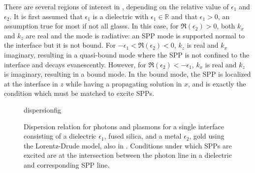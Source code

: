 There are several regions of interest in ,
depending on the relative value of $\epsilon_1$ and $\epsilon_2$.  It is
first assumed that $\epsilon_1$ is a dielectric with
$\epsilon_1\in\mathbb{R}$ and that $\epsilon_1 > 0$, an assumption true for
most if not all glasss.  In this case, for $\Re(\epsilon_2)>0$, both $k_x$
and $k_z$ are real and the mode is radiative: an SPP mode is supported
normal to the interface but it is not bound.  For
$-\epsilon_1<\Re(\epsilon_2)<0$, $k_z$ is real and $k_x$ imaginary,
resulting in a quasi-bound mode where the SPP is not confined to the
interface and decays evanescently.  However, for
$\Re(\epsilon_2)<-\epsilon_1$, $k_x$ is real and $k_z$ is imaginary,
resulting in a bound mode.  In the bound mode, the SPP is localized at the
interface in $z$ while having a propagating solution in $x$, and is exactly
the condition which must be matched to excite SPPs.
\begin{figure}[ht]
 \centering
{dispersionfig}
\caption{ Dispersion relation for photons and plasmons for a single
interface consisting of a dielectric $\epsilon_1$, fused silica, and a
metal $\epsilon_2$, gold using the Lorentz-Drude model, also in
. Conditions under which SPPs are excited are at the
intersection between the photon line in a dielectric and corresponding SPP line.  }
\label{fig:dispersionrelation}
\end{figure}
